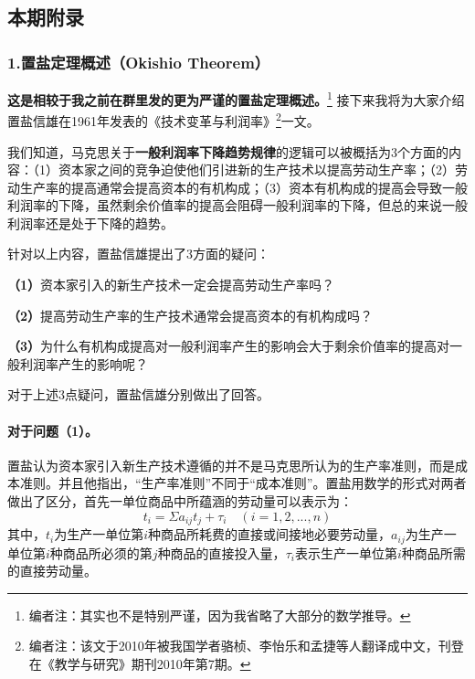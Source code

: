 \documentclass[a4paper,twoside,12pt,AutoFakeBold]{ctexart}
\begin{document}
\newpage
\subsection{本期附录}
\subsubsection{1.置盐定理概述（Okishio Theorem）}
\noindent\textbf{这是相较于我之前在群里发的更为严谨的置盐定理概述。}\footnote{编者注：其实也不是特别严谨，因为我省略了大部分的数学推导。} 接下来我将为大家介绍置盐信雄在1961年发表的《技术变革与利润率》\footnote{编者注：该文于2010年被我国学者骆桢、李怡乐和孟捷等人翻译成中文，刊登在《教学与研究》期刊2010年第7期。}一文。

\vspace{0.5cm} %

我们知道，马克思关于\textbf{一般利润率下降趋势规律}的逻辑可以被概括为3个方面的内容：（1）资本家之间的竞争迫使他们引进新的生产技术以提高劳动生产率；（2）劳动生产率的提高通常会提高资本的有机构成；（3）资本有机构成的提高会导致一般利润率的下降，虽然剩余价值率的提高会阻碍一般利润率的下降，但总的来说一般利润率还是处于下降的趋势。

针对以上内容，置盐信雄提出了3方面的疑问：
\begin{tcolorbox}[colback=gray!20, colframe=gray!100, sharp corners, leftrule={3pt}, rightrule={0pt}, toprule={0pt}, bottomrule={0pt}, left={2pt}, right={2pt}, top={3pt}, bottom={3pt}] 
\textbf{（1）}资本家引入的新生产技术一定会提高劳动生产率吗？

\textbf{（2）}提高劳动生产率的生产技术通常会提高资本的有机构成吗？

\textbf{（3）}为什么有机构成提高对一般利润率产生的影响会大于剩余价值率的提高对一般利润率产生的影响呢？

\end{tcolorbox}


对于上述3点疑问，置盐信雄分别做出了回答。

\paragraph{对于问题（1）。}置盐认为资本家引入新生产技术遵循的并不是马克思所认为的生产率准则，而是成本准则。并且他指出，“生产率准则”不同于“成本准则”。置盐用数学的形式对两者做出了区分，首先一单位商品中所蕴涵的劳动量可以表示为：
\begin{equation}\tag{1}
    t_i=\Sigma a_{ij}t_j+\tau_i \quad (i=1,2,...,n)
\end{equation}
其中，$t_i$为生产一单位第$i$种商品所耗费的直接或间接地必要劳动量，$a_{ij}$为生产一单位第$i$种商品所必须的第$j$种商品的直接投入量，$\tau_i$表示生产一单位第$i$种商品所需的直接劳动量。
\end{document}
